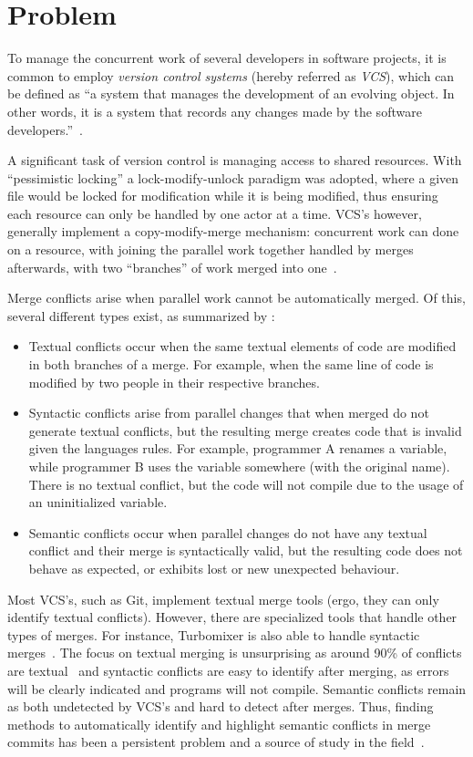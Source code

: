 \section{Problem} \label{sec:problem}

To manage the concurrent work of several developers in software projects, it is common to employ \emph{version control systems} (hereby referred as \emph{VCS}), which can be defined as ``a system that manages the development of an evolving object. In other words, it is a system that records any changes made by the software developers.''~\cite{kn:vers_review}.

A significant task of version control is managing access to shared resources.
With ``pessimistic locking'' a lock-modify-unlock paradigm was adopted, where a given file would be locked for modification while it is being modified, thus ensuring each resource can only be handled by one actor at a time. VCS's however, generally implement a copy-modify-merge mechanism: concurrent work can done on a resource, with joining the parallel work together handled by merges afterwards, with two ``branches'' of work merged into one~\cite{kn:vers_ott}.

Merge conflicts arise when parallel work cannot be automatically merged. Of this, several different types exist, as summarized by \citet{kn:tmens}:

\begin{itemize}
  \item Textual conflicts occur when the same textual elements of code are modified in both branches of a merge. For example, when the same line of code is modified by two people in their respective branches.
  \item Syntactic conflicts arise from parallel changes that when merged do not generate textual conflicts, but the resulting merge creates code that is invalid given the languages rules. For example, programmer A renames a variable, while programmer B uses the variable somewhere (with the original name). There is no textual conflict, but the code will not compile due to the usage of an uninitialized variable.
  \item Semantic conflicts occur when parallel changes do not have any textual conflict and their merge is syntactically valid, but the resulting code does not behave as expected, or exhibits lost or new unexpected behaviour.
\end{itemize}

Most VCS's, such as Git, implement textual merge tools (ergo, they can only identify textual conflicts). However, there are specialized tools that handle other types of merges. For instance, Turbomixer is also able to handle syntactic merges~\cite{kn:tmens}. The focus on textual merging is unsurprising as around 90\% of conflicts are textual~\cite{kn:lcsd} and syntactic conflicts are easy to identify after merging, as errors will be clearly indicated and programs will not compile.
Semantic conflicts remain as both undetected by VCS's and hard to detect after merges. Thus, finding methods to automatically identify and highlight semantic conflicts in merge commits has been a persistent problem and a source of study in the field~\cite{kn:nuno,kn:leuson,kn:leuson2}.

